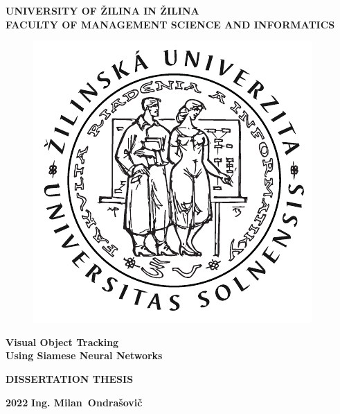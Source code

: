\begin{titlepage}
    \begin{center}
        \vspace*{1cm} %

        \normalsize
        \textbf{UNIVERSITY OF ŽILINA IN ŽILINA}\\
        \textbf{FACULTY OF MANAGEMENT SCIENCE AND INFORMATICS}\\

        \begin{figure}[!h]
            \centerline{\includegraphics[width=0.25\linewidth]{figures/formal_pages/FRI_logo.pdf}}
        \end{figure}

        \vspace{5cm}

        \LARGE
        \textbf{Visual Object Tracking\\Using Siamese Neural Networks}

        \vspace{1cm}

        \Large
        \textbf{DISSERTATION THESIS}
    \end{center}

    \vspace{2cm}

    \vfill

    \normalsize

    \vspace{2cm}

    \textbf{2022} \hfill \textbf{Ing. Milan~Ondra\v{s}ovi\v{c}}

\end{titlepage}
